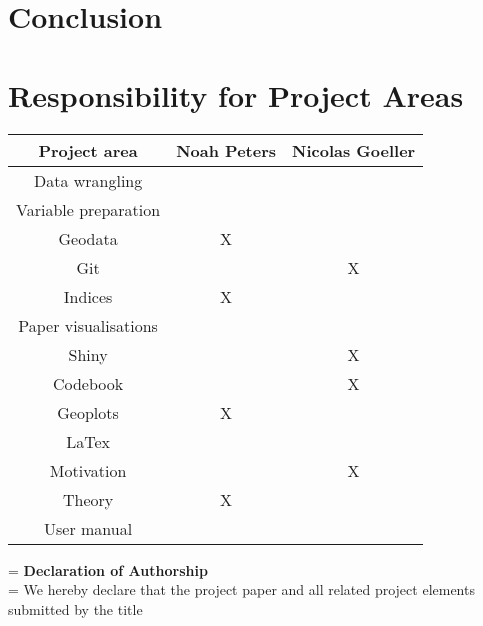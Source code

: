\documentclass[preprint,12pt,authoryear]{elsarticle}
\begin{document}
\section{Conclusion}

	
\newpage
 \appendix
	
\section{Responsibility for Project Areas}

\begin{tabular}{|c|c|c|}
	\hline 
	\textbf{Project area}	& \textbf{Noah Peters} 	& \textbf{Nicolas Goeller} 	\\ 
	\hline 
	Data wrangling			&  		   				&  				 			\\ 
	\hline 
	Variable preparation 	&  		   				&  				 			\\ 
	\hline 
	Geodata					&  		   X			&  				 			\\ 
	\hline 
	Git	     			 	&  		   				&  				X 			\\ 
	\hline 			
	Indices				 	&  		   X			&  				 			\\ 
	\hline 
	Paper visualisations 	&  		   				&  				 			\\ 
	\hline 
	Shiny 				 	&  		   				&  				X 			\\ 
	\hline 
	Codebook 			 	&  		   				&  				X 			\\ 
	\hline 
	Geoplots 			 	&  		   X			&  				 			\\ 
	\hline 
	LaTex				 	&  		   				&  				 			\\ 
	\hline 
	Motivation			 	&  		   				&  				X 			\\ 
	\hline 
	Theory				 	&  		   X			&  				 			\\ 
	\hline 
	User manual			 	&  		   				&  				 			\\ 
	\hline 
\end{tabular}

	\newpage
	 
	
	
	\newpage
	\hangindent=\parindent
	\parindent 0pt
	\textbf{Declaration of Authorship}
	\\
	
	\hangindent=\parindent
	\parindent 0pt
	We hereby declare that the project paper and all related project elements submitted by the title 
	\\
	
\end{document}
